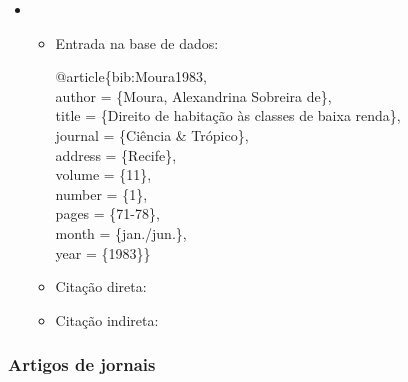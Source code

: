 \documentclass[a4paper,12pt,oneside,onecolumn]{uerj}
\newcommand{\formato}[1]{\begin{flushleft}{#1}\end{flushleft}}
\begin{document}
\begin{itemize}[label={Ex.:},leftmargin=\parindent,parsep=0pt,itemsep=0pt]
  \item \formato{\citetext{bib:Moura1983}}

  \begin{itemize}[leftmargin=*,parsep=0pt,itemsep=0pt]
    \item Entrada na base de dados:

    \formato{
      @article\{bib:Moura1983,\\
        author = \{Moura, Alexandrina Sobreira de\},\\
        title = \{Direito de habita{\c c}{\~a}o {\`a}s classes de baixa renda\},\\
        journal = \{Ci{\^e}ncia \& Tr{\'o}pico\},\\
        address = \{Recife\},\\
        volume = \{11\},\\
        number = \{1\},\\
        pages = \{71-78\},\\
        month = \{jan./jun.\},\\
        year = \{1983\}\}\\
    }

    \item Citação direta: 
    \item Citação indireta: \cite{bib:Moura1983}
  \end{itemize}
\end{itemize}

\subsubsection{Artigos de jornais}
\end{document}
